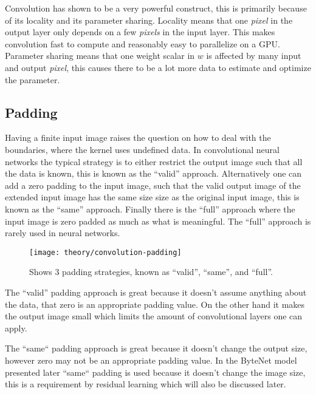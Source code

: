 Convolution has shown to be a very powerful construct, this is primarily because of its locality and its parameter sharing. Locality means that one \textit{pixel} in the output layer only depends on a few \textit{pixels} in the input layer. This makes convolution fast to compute and reasonably easy to parallelize on a GPU. Parameter sharing means that one weight scalar in $w$ is affected by many input and output \textit{pixel}, this causes there to be a lot more data to estimate and optimize the parameter.

\subsection{Padding}
Having a finite input image raises the question on how to deal with the boundaries, where the kernel uses undefined data. In convolutional neural networks the typical strategy is to either restrict the output image such that all the data is known, this is known as the ``valid'' approach. Alternatively one can add a zero padding to the input image, such that the valid output image of the extended input image has the same size size as the original input image, this is known as the ``same'' approach. Finally there is the ``full'' approach where the input image is zero padded as much as what is meaningful. The ``full'' approach is rarely used in neural networks.

\begin{figure}[h]
	\centering
	\texttt{[image: theory/convolution-padding]}
	\caption{Shows 3 padding strategies, known as ``valid'', ``same'', and ``full''.}
	\label{fig:convolution:padding}
\end{figure}

The ``valid'' padding approach is great because it doesn't assume anything about the data, that zero is an appropriate padding value. On the other hand it makes the output image small which limits the amount of convolutional layers one can apply.

The ``same`` padding approach is great because it doesn't change the output size, however zero may not be an appropriate padding value. In the ByteNet model presented later ``same`` padding is used because it doesn't change the image size, this is a requirement by residual learning which will also be discussed later.

